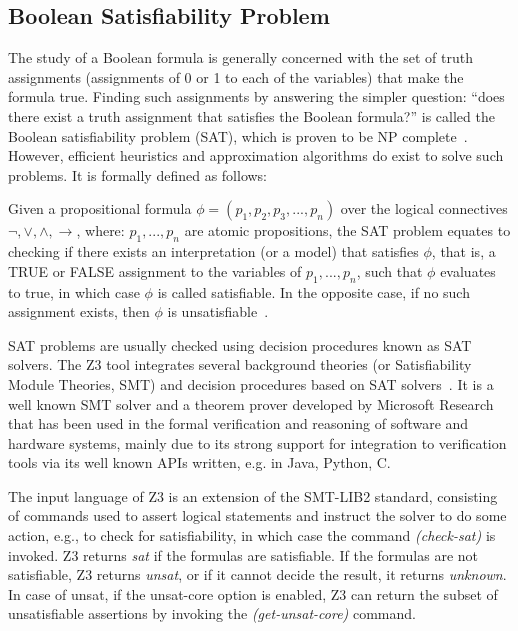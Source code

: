 \subsection*{Boolean Satisfiability Problem}
The study of a Boolean formula is generally concerned with the set of truth assignments (assignments of 0 or 1 to each of the variables) that make the formula true. Finding such assignments by answering the simpler question: ``does there exist a truth assignment that satisfies the Boolean formula?'' is called the Boolean satisfiability problem (SAT), which is proven to be NP complete~\cite{devlin2008satisfiability}\cite{Biere2009HandbookSatisfiability}. However, efficient heuristics and approximation algorithms do exist to solve such problems. It is formally defined as follows:
\begin{definition}
Given a propositional formula $\phi = (p_1, p_2, p_3, ..., p_n)$ over the logical connectives $\neg,\lor,\land,\rightarrow$, where: $p_1, ..., p_n$ are atomic propositions, the SAT problem equates to checking if there exists an interpretation (or a model) that satisfies $\phi$, that is, a TRUE or FALSE assignment to the variables of $p_1, ..., p_n$, such that $\phi$ evaluates to true, in which case $\phi$ is called satisfiable. In the opposite case, if no such assignment exists, then $\phi$ is unsatisfiable~\cite{devlin2008satisfiability}.  
\end{definition}

SAT problems are usually checked using decision procedures known as SAT solvers. The Z3 tool integrates several background theories (or Satisfiability Module Theories, SMT) and decision procedures based on SAT solvers~\cite{DeMoura2008Z3:Solver}. It is a well known SMT solver and a theorem prover developed by Microsoft Research that has been used in the formal verification and reasoning of software and hardware systems, mainly due to its strong support for integration to verification tools via its well known APIs written, e.g. in Java, Python, C.

The input language of Z3 is an extension of the SMT-LIB2 standard, consisting of commands used to assert logical statements and instruct the solver to do some action, e.g., to check for satisfiability, in which case the command \textit{(check-sat)} is invoked. Z3 returns \textit{sat} if the formulas are satisfiable. If the formulas are not satisfiable, Z3 returns \textit{unsat}, or if it cannot decide the result, it returns \textit{unknown}. In case of unsat, if the unsat-core option is enabled, Z3 can return the subset of unsatisfiable assertions by invoking the \textit{(get-unsat-core)} command.

